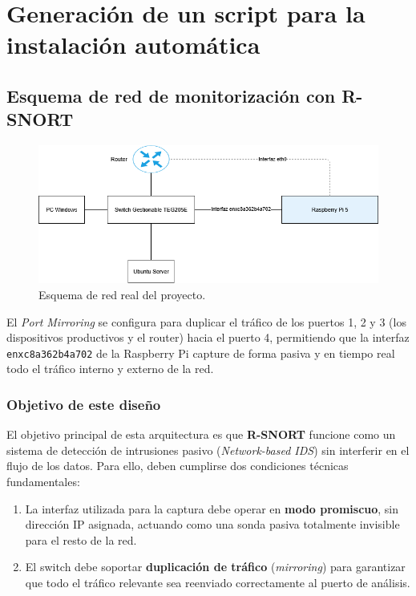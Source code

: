 \documentclass[11pt,a4paper,twoside]{report}
\begin{document}
\newpage


\section{Generación de un script para la instalación automática}

\subsection{Esquema de red de monitorización con R-SNORT}

\begin{figure}[H]
	\centering
	\includegraphics[scale=0.6]{script_automatico/network.png}
	\caption{Esquema de red real del proyecto.}
\end{figure}

El \textit{Port Mirroring} se configura para duplicar el tráfico de los puertos 1, 2 y 3 (los dispositivos productivos y el router) hacia el puerto 4, permitiendo que la interfaz \texttt{enxc8a362b4a702} de la Raspberry Pi capture de forma pasiva y en tiempo real todo el tráfico interno y externo de la red.

\subsubsection{Objetivo de este diseño}

El objetivo principal de esta arquitectura es que \textbf{R-SNORT} funcione como un sistema de detección de intrusiones pasivo (\textit{Network-based IDS}) sin interferir en el flujo de los datos. Para ello, deben cumplirse dos condiciones técnicas fundamentales:

\begin{enumerate}
	\item La interfaz utilizada para la captura debe operar en \textbf{modo promiscuo}, sin dirección IP asignada, actuando como una sonda pasiva totalmente invisible para el resto de la red.
	\item El switch debe soportar \textbf{duplicación de tráfico} (\textit{mirroring}) para garantizar que todo el tráfico relevante sea reenviado correctamente al puerto de análisis.
\end{enumerate}
\end{document}
